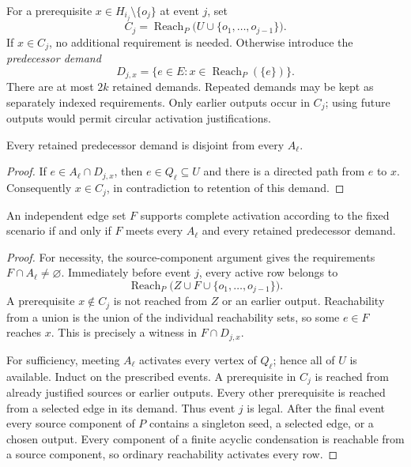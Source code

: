 For a prerequisite $x\in H_{i_j}\setminus\{o_j\}$ at event $j$, set
\[
 C_j=\operatorname{Reach}_P
         \bigl(U\cup\{o_1,\ldots,o_{j-1}\}\bigr).
\]
If $x\in C_j$, no additional requirement is needed. Otherwise introduce
the \emph{predecessor demand}
\[
 D_{j,x}=\{e\in E:
              x\in\operatorname{Reach}_P(\{e\})\}.
 \tag{$\ast$}\label{eq:fpt-predecessor-demand}
\]
There are at most $2k$ retained demands. Repeated demands may be kept as
separately indexed requirements. Only earlier outputs occur in $C_j$;
using future outputs would permit circular activation justifications.

\begin{lemma}
\label{lem:fpt-demand-separation}
Every retained predecessor demand is disjoint from every $A_\ell$.
\end{lemma}
\begin{proof}
If $e\in A_\ell\cap D_{j,x}$, then $e\in Q_\ell\subseteq U$ and
there is a directed path from $e$ to $x$. Consequently $x\in C_j$, in
contradiction to retention of this demand.
\end{proof}

\begin{proposition}
\label{prop:fpt-fixed-scenario}
An independent edge set $F$ supports complete activation according to the
fixed scenario if and only if $F$ meets every $A_\ell$ and every retained
predecessor demand.
\end{proposition}
\begin{proof}
For necessity, the source-component argument gives the requirements
$F\cap A_\ell\ne\varnothing$. Immediately before event $j$, every
active row belongs to
\[
 \operatorname{Reach}_P
       \bigl(Z\cup F\cup\{o_1,\ldots,o_{j-1}\}\bigr).
\]
A prerequisite $x\notin C_j$ is not reached from $Z$ or an earlier
output. Reachability from a union is the union of the individual
reachability sets, so some $e\in F$ reaches $x$. This is precisely a
witness in $F\cap D_{j,x}$.

For sufficiency, meeting $A_\ell$ activates every vertex of $Q_\ell$;
hence all of $U$ is available. Induct on the prescribed events. A
prerequisite in $C_j$ is reached from already justified sources or earlier
outputs. Every other prerequisite is reached from a selected edge in its
demand. Thus event $j$ is legal. After the final event every source
component of $P$ contains a singleton seed, a selected edge, or a chosen
output. Every component of a finite acyclic condensation is reachable
from a source component, so ordinary reachability activates every row.
\end{proof}

